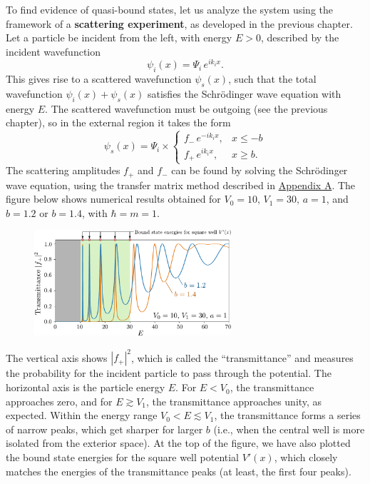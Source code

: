 \documentclass[pra,12pt]{revtex4}
\begin{document}
To find evidence of quasi-bound states, let us analyze the system
using the framework of a \textbf{scattering experiment}, as developed
in the previous chapter.  Let a particle be incident from the left,
with energy $E > 0$, described by the incident wavefunction
$$\psi_i(x) = \Psi_i \, e^{ik_i x}.$$
This gives rise to a scattered wavefunction $\psi_s(x)$, such that the
total wavefunction $\psi_i(x) + \psi_s(x)$ satisfies the Schr\"odinger
wave equation with energy $E$.  The scattered wavefunction must be
outgoing (see the previous chapter), so in the external region it
takes the form
$$\psi_s(x) = \Psi_i \times \begin{cases}f_- \,e^{-ik_ix}, & x \le -b \\ f_+ \,e^{ik_ix}, & x \ge b.\end{cases}$$
The scattering amplitudes $f_+$ and $f_-$ can be found by solving the
Schr\"odinger wave equation, using the transfer matrix method
described in \hyperref[sec:appendix]{Appendix A}.  The figure below
shows numerical results obtained for $V_0 = 10,\,V_1 = 30,\,a=1$, and
$b = 1.2$ or $b = 1.4$, with $\hbar = m = 1$.

\begin{figure}[h]
  \centering\includegraphics[width=0.65\textwidth]{resonances}
\end{figure}

The vertical axis shows $|f_+|^2$, which is called the
``transmittance'' and measures the probability for the incident
particle to pass through the potential.  The horizontal axis is the
particle energy $E$.  For $E < V_0$, the transmittance approaches
zero, and for $E \gtrsim V_1$, the transmittance approaches unity, as
expected.  Within the energy range $V_0 < E \lesssim V_1$, the
transmittance forms a series of narrow peaks, which get sharper for
larger $b$ (i.e., when the central well is more isolated from the
exterior space).  At the top of the figure, we have also plotted the
bound state energies for the square well potential $V'(x)$, which
closely matches the energies of the transmittance peaks (at least, the
first four peaks).
\end{document}
